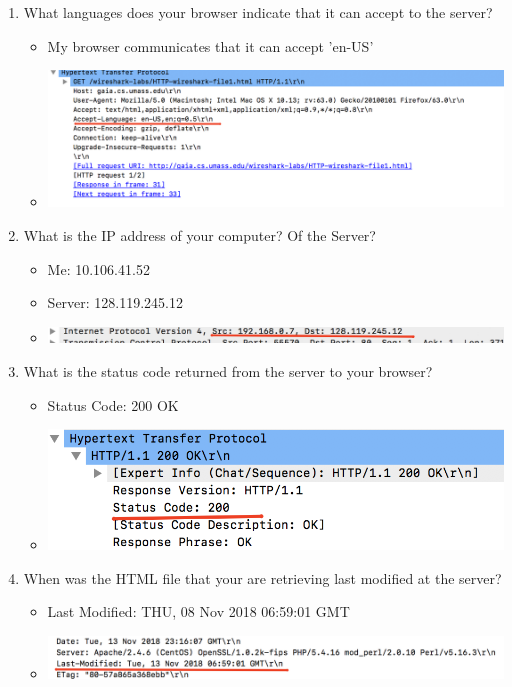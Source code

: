 \documentclass{article}
\begin{document}
\begin{enumerate}
      \item What languages does your browser indicate that it can accept to the server?
      \begin{itemize}
        \item My browser communicates that it can accept 'en-US'
        \item \includegraphics[scale=0.5]{images/HTTP2.png}
      \end{itemize}
      \item What is the IP address of your computer? Of the Server? 
        \begin{itemize}
          \item Me: 10.106.41.52
          \item Server: 128.119.245.12
          \item \includegraphics[scale=0.5]{images/HTTP3.png}
        \end{itemize}
      \item What is the status code returned from the server to your browser? 
        \begin{itemize}
          \item Status Code: 200 OK
          \item \includegraphics[scale=0.5]{images/HTTP4.png}
        \end{itemize}
      \item When was the HTML file that your are retrieving last modified at the server?
        \begin{itemize}
          \item Last Modified: THU, 08 Nov 2018 06:59:01 GMT
          \item \includegraphics[scale=0.5]{images/HTTP5.png}

\end{itemize}
\end{enumerate}
\end{document}
